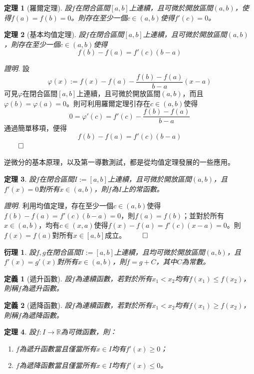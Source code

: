 \documentclass[12pt]{article}
\newtheorem{definition}{定義}
\newtheorem*{theorem}{定理}
\newtheorem*{corollary}{衍理}
\renewenvironment*{proof}{\textit{證明.}}{\hfill$\qed$}
\begin{document}
    \begin{theorem}[羅爾定理]
        設$f$在閉合區間$[a,b]$上連續，且可微於開放區間$(a,b)$，使得$f(a)=f(b)=0$。則存在至少一個$c\in(a,b)$使得$f'(c)=0$。
    \end{theorem}

    \begin{theorem}[基本均值定理]
        設$f$在閉合區間$[a,b]$上連續，且可微於開放區間$(a,b)$，則存在至少一個$c\in(a,b)$使得$$f(b)-f(a)=f'(c)(b-a)$$
    \end{theorem}

    \begin{proof}
        設$$\varphi(x):=f(x)-f(a)-\frac{f(b)-f(a)}{b-a}(x-a)$$可見$\varphi$在閉合區間$[a,b]$上連續，且可微於開放區間$(a,b)$，而且$\varphi(b)=\varphi(a)=0$。則可利用羅爾定理引存在$c\in(a,b)$使得$$0=\varphi'(c)=f'(c)-\frac{f(b)-f(a)}{b-a}$$通過簡單移項，便得$$f(b)-f(a)=f'(c)(b-a)$$
    \end{proof}

    逆微分的基本原理，以及第一導數測試，都是從均值定理發展的一些應用。

    \begin{theorem}
        設$f$在閉合區間$I:=[a,b]$上連續，且可微於開放區間$(a,b)$，且$f'(x)=0$對所有$x\in(a,b)$，則$f$為$I$上的常函數。
    \end{theorem}

    \begin{proof}
        利用均值定理，存在至少一個$c\in(a,b)$使得$f(b)-f(a)=f'(c)(b-a)=0$，則$f(a)=f(b)$；並對於所有$x\in(a,b)$，均有$c\in(x,a)$使得$f(x)-f(a)=f'(c)(x-a)=0$。則$f(x)=f(a)$對所有$x\in[a,b]$成立。
    \end{proof}

    \begin{corollary}
        設$f,g$在閉合區間$I:=[a,b]$上連續，且均可微於開放區間$(a,b)$，且$f'(x)=g'(x)$對所有$x\in(a,b)$，則$f=g+C$，其中$C$為常數。
    \end{corollary}

    \begin{definition}[遞升函數]
        設$f$為連續函數，若對於所有$x_1<x_2$均有$f(x_1)\leq f(x_2)$，則稱$f$為遞升函數。
    \end{definition}

    \begin{definition}[遞降函數]
        設$f$為連續函數，若對於所有$x_1<x_2$均有$f(x_1)\geq f(x_2)$，則稱$f$為遞降函數。
    \end{definition}

    \begin{theorem}
        設$f:I\to\mathbb{R}$為可微函數，則：\begin{enumerate}
            \item $f$為遞升函數當且僅當所有$x\in I$均有$f'(x)\geq 0$；
            \item $f$為遞降函數當且僅當所有$x\in I$均有$f'(x)\leq 0$。
        \end{enumerate}
    \end{theorem}
\end{document}
